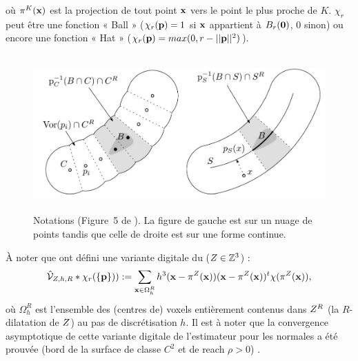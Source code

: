 %
où $\pi^K(\mathbf{x})$ est la projection de tout point $\mathbf{x}$ vers le point le plus proche de
$K$. $\chi_r$ peut être une fonction « Ball » ($\chi_r(\mathbf{p}) = 1$ si $\mathbf{x}$
appartient à $B_{r}(\mathbf{0})$, $0$ sinon) ou encore une fonction « Hat »
($\chi_r(\mathbf{p}) = max(0, r - ||\mathbf{p}||^2)$).
%
\begin{figure}[ht]{
    \begin{center}
    \includegraphics[height=6cm]{images/Feature/VCM_notations}
    \end{center}}
    \caption[Notations.]{Notations (Figure~5 de \cite{Merigot2011}). La figure de gauche est sur un nuage de points tandis que celle de droite est sur une forme continue. \label{fig:mellado-multiscale}}
\end{figure}


À noter que  ont défini une variante digitale du
\VCM ($Z \in \mathbb{Z}^3$) :
%
\begin{equation}
  \hat{\mathcal{V}}_{Z,h,R} \ast \chi_r(\{\mathbf{p}\})) := \sum_{\mathbf{x} \in \Omega_h^R} h^3 (\mathbf{x} - \pi^{Z}(\mathbf{x})) (\mathbf{x} - \pi^{Z}(\mathbf{x}))^t \chi(\pi^{Z}(\mathbf{x})) ,
\end{equation}
%
où $\Omega_h^R$ est l'ensemble des (centres de) voxels entièrement contenus dans
$Z^R$ (la $R$-dilatation de $Z$) au pas de discrétisation $h$.
%
Il est à noter que la convergence asymptotique de cette variante digitale de
l'estimateur \VCM pour les normales a été prouvée (bord de la surface de classe
$C^2$ et de reach $\rho > 0$) \cite{Cuel2014DGCI}.


